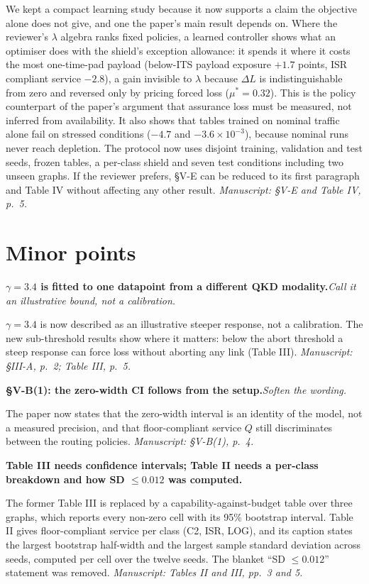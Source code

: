 \documentclass[10pt,a4paper]{article}
\newcommand{\loc}[1]{\textit{Manuscript: #1.}}
\newcommand{\comment}[2]{\par\medskip\noindent\textbf{#1}\hspace{0.4em}\textit{#2}\par}
\begin{document}
We kept a compact learning study because it now supports a claim the objective alone
does not give, and one the paper's main result depends on. Where the reviewer's
$\lambda$ algebra ranks fixed policies, a learned controller shows what an optimiser
does with the shield's exception allowance: it spends it where it costs the most
one-time-pad payload (below-ITS payload exposure $+1.7$ points, ISR compliant service
$-2.8$), a gain invisible to $\lambda$ because $\Delta L$ is indistinguishable from
zero and reversed only by pricing forced loss ($\mu^\ast=0.32$). This is the policy
counterpart of the paper's argument that assurance loss must be measured, not
inferred from availability. It also shows that tables trained on nominal traffic
alone fail on stressed conditions ($-4.7$ and $-3.6\times10^{-3}$), because nominal
runs never reach depletion. The protocol now uses disjoint training, validation and
test seeds, frozen tables, a per-class shield and seven test conditions including two
unseen graphs. If the reviewer prefers, \S V-E can be reduced to its first paragraph
and Table IV without affecting any other result.
\loc{\S V-E and Table IV, p.~5}

\section*{Minor points}

\comment{$\gamma=3.4$ is fitted to one datapoint from a different QKD modality.}{Call it an illustrative bound, not a calibration.}
$\gamma=3.4$ is now described as an illustrative steeper response, not a calibration.
The new sub-threshold results show where it matters: below the abort threshold a steep
response can force loss without aborting any link (Table III).
\loc{\S III-A, p.~2; Table III, p.~5}

\comment{\S V-B(1): the zero-width CI follows from the setup.}{Soften the wording.}
The paper now states that the zero-width interval is an identity of the model, not a
measured precision, and that floor-compliant service $Q$ still discriminates between
the routing policies.
\loc{\S V-B(1), p.~4}

\comment{Table III needs confidence intervals; Table II needs a per-class breakdown and how SD $\le0.012$ was computed.}{}
The former Table III is replaced by a capability-against-budget table over three
graphs, which reports every non-zero cell with its 95\% bootstrap interval. Table II
gives floor-compliant service per class (C2, ISR, LOG), and its caption states the
largest bootstrap half-width and the largest sample standard deviation across seeds,
computed per cell over the twelve seeds. The blanket ``SD $\le 0.012$'' statement was
removed.
\loc{Tables II and III, pp.~3 and 5}
\end{document}
